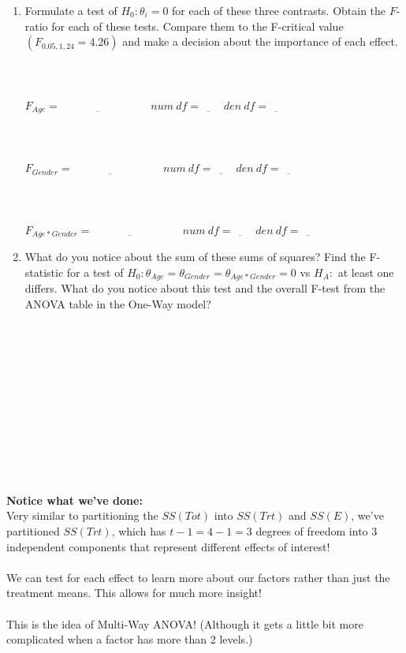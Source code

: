 \begin{enumerate}
\item Formulate a test of $H_0:\theta_i=0$ for each of these three contrasts.  Obtain the $F$-ratio for each of these tests. Compare them to the F-critical value $(F_{0.05,1,24}=4.26)$ and make a decision about the importance of each effect.\\~\\~\\~\\
$F_{Age}=\underbar{~~~~~~~~~~~~~~~~~~~~~~~~~~~~~~~~}~~~~~num~df=\underbar{~~~~~~~}~~den~df=\underbar{~~~~~~~}$\\~\\~\\~\\
$F_{Gender}=\underbar{~~~~~~~~~~~~~~~~~~~~~~~~~~~~~~~~}~~~~~num~df=\underbar{~~~~~~~}~~den~df=\underbar{~~~~~~~}$\\~\\~\\~\\
$F_{Age*Gender}=\underbar{~~~~~~~~~~~~~~~~~~~~~~~~~~~~~~~~}~~~~~num~df=\underbar{~~~~~~~}~~den~df=\underbar{~~~~~~~}$
\item What do you notice about the sum of these sums of squares?  Find the F-statistic for a test of $H_0:\theta_{Age}=\theta_{Gender}=\theta_{Age*Gender}=0$ vs $H_A:$ at least one differs.  What do you notice about this test and the overall F-test from the ANOVA table in the One-Way model?\\~\\~\\~\\~\\~\\~\\~\\~\\~\\~\\~\\
\end{enumerate}

\textbf{Notice what we've done:}\\
Very similar to partitioning the $SS(Tot)$ into $SS(Trt)$ and $SS(E)$, we've partitioned $SS(Trt)$, which has $t-1=4-1=3$ degrees of freedom into 3 independent components that represent different effects of interest!  \\~\\
We can test for each effect to learn more about our factors rather than just the treatment means.  This allows for much more insight!\\~\\
This is the idea of Multi-Way ANOVA!  (Although it gets a little bit more complicated when a factor has more than 2 levels.)

